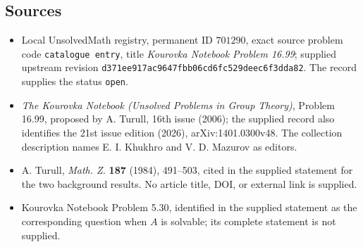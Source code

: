 \documentclass[11pt]{article}
\begin{document}
\subsection{Sources}
\begin{itemize}
\item Local UnsolvedMath registry, permanent ID \(701290\), exact source problem code \texttt{catalogue entry}, title \emph{Kourovka Notebook Problem 16.99}; supplied upstream revision \texttt{d371ee917ac9647fbb06cd6fc529deec6f3dda82}. The record supplies the status \texttt{open}.
\item \emph{The Kourovka Notebook (Unsolved Problems in Group Theory)}, Problem 16.99, proposed by A. Turull, 16th issue (2006); the supplied record also identifies the 21st issue edition (2026), arXiv:1401.0300v48. The collection description names E. I. Khukhro and V. D. Mazurov as editors.
\item A. Turull, \emph{Math. Z.} \textbf{187} (1984), 491--503, cited in the supplied statement for the two background results. No article title, DOI, or external link is supplied.
\item Kourovka Notebook Problem 5.30, identified in the supplied statement as the corresponding question when \(A\) is solvable; its complete statement is not supplied.
\end{itemize}
\end{document}
